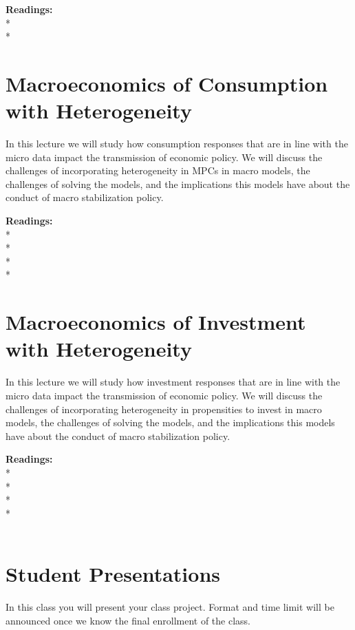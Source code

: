 \documentclass [12pt]{article}
\begin{document}
\noindent\textbf{Readings:}\\
*\\
*\\


\section{Macroeconomics of Consumption with Heterogeneity}

In this lecture we will study how consumption responses that are in line with the micro data impact the transmission of economic policy. We will discuss the challenges of incorporating heterogeneity in MPCs in macro models, the challenges of solving the models, and the implications this models have about the conduct of macro stabilization policy.

\noindent\textbf{Readings:}\\
* \\
* \\
* \\
* \\


\section{Macroeconomics of Investment with Heterogeneity}

In this lecture we will study how investment responses that are in line with the micro data impact the transmission of economic policy. We will discuss the challenges of incorporating heterogeneity in propensities to invest in macro models, the challenges of solving the models, and the implications this models have about the conduct of macro stabilization policy.

\noindent\textbf{Readings:}\\
* \\
* \\
* \\
* \\
\\

\section{Student Presentations}

In this class you will present your class project. Format and time limit will be announced once we know the final enrollment of the class.
\end{document}
